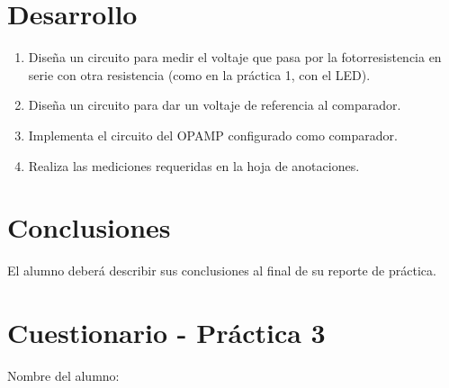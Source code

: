 
\section{Desarrollo}

	\begin{enumerate}
		\item Diseña un circuito para medir el voltaje que pasa por la fotorresistencia en serie con otra resistencia (como en la práctica 1, con el LED).
		\item Diseña un circuito para dar un voltaje de referencia al comparador.
		\item Implementa el circuito del OPAMP configurado como comparador.
		\item Realiza las mediciones requeridas en la hoja de anotaciones.
	\end{enumerate}



\section{Conclusiones}

	El alumno deberá describir sus conclusiones al final de su reporte de práctica.


\clearpage
\section{Cuestionario - Práctica 3}
	Nombre del alumno: \\[0.2cm]
	\horrule{0.5pt} \\[0.2cm] %

